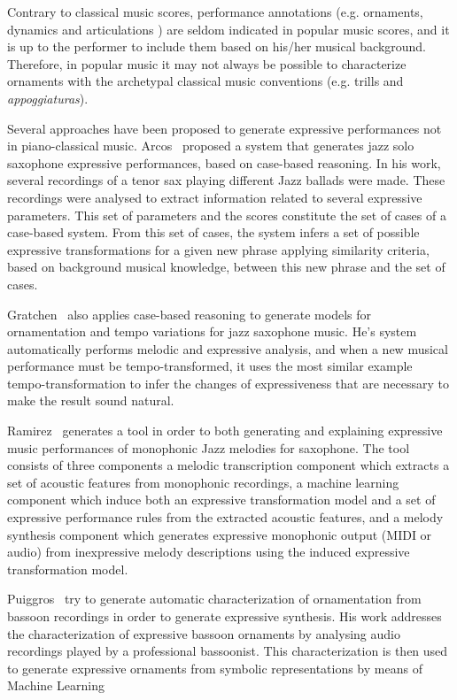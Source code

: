 Contrary to classical music scores, performance annotations (e.g. ornaments, dynamics and articulations ) are seldom indicated in popular music scores, and it is up to the performer to include them based on his/her musical background. Therefore, in popular music it may not always be possible to characterize ornaments with the archetypal classical music conventions (e.g. trills and \textit{appoggiaturas}). 

Several approaches have been proposed to generate expressive performances not in piano-classical music. Arcos~\cite{Arcos1998} proposed a system that generates jazz solo saxophone expressive performances, based on case-based reasoning. In his work, several recordings of a tenor sax playing different Jazz ballads were made. These recordings were analysed to extract information related to several expressive parameters. This set of parameters and the scores constitute the set of cases of a case-based system. From this set of cases, the system infers a set of possible expressive transformations for a given new phrase applying similarity criteria, based on background musical knowledge, between this new phrase and the set of cases.

Gratchen~\cite{Grachten2006} also applies case-based reasoning to generate models for ornamentation and tempo variations for jazz saxophone music. He's system automatically performs melodic and expressive analysis, and when a new musical performance must be tempo-transformed, it uses the most similar example tempo-transformation to infer the changes of expressiveness that are necessary to make the result sound natural.

Ramirez~\cite{Ramirez2006} generates a tool in order to both generating and explaining expressive music performances of monophonic Jazz melodies for saxophone. The tool consists of three components a melodic transcription component which extracts a set of acoustic features from monophonic recordings, a machine learning component which induce both an expressive transformation model and a set of expressive performance rules from the extracted acoustic features, and a melody synthesis component which generates expressive monophonic output (MIDI or audio) from inexpressive melody descriptions using the induced expressive transformation model.

Puiggros~\cite{Puiggros2006} try to generate automatic characterization of ornamentation from bassoon recordings in order to generate expressive synthesis. His work addresses the characterization of expressive bassoon ornaments by analysing audio recordings played by a professional bassoonist. This characterization is then used to generate expressive ornaments from symbolic representations by means of Machine Learning

